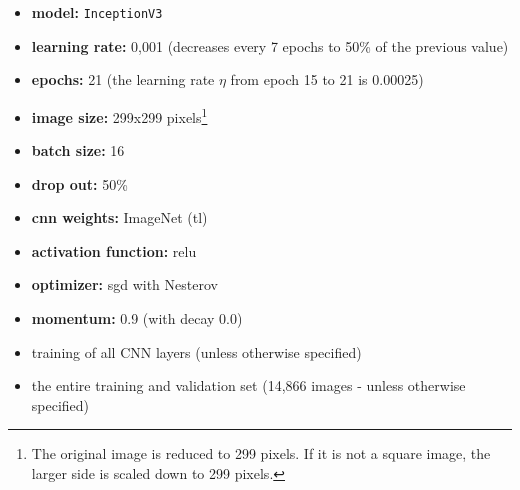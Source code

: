 \documentclass[10pt]{article}
\newif\ifen
\newif\ifde
\newcommand{\en}[1]{\ifen#1\fi}
\newcommand{\de}[1]{\ifde#1\fi}
\begin{document}
					\begin{itemize}
						\setlength\itemsep{0em}
						\item \textbf{model:} \texttt{InceptionV3}
						\item \textbf{learning rate:} 0,001 (decreases every 7 epochs to 50\% of the previous value)
						\item \textbf{epochs:} 21 (the learning rate \(\eta\) from epoch 15 to 21 is 0.00025)
						\item \textbf{image size:} 299x299 pixels\footnote{The original image is reduced to 299 pixels. If it is not a square image, the larger side is scaled down to 299 pixels.}
						\item \textbf{batch size:} 16
						\item \textbf{drop out:} 50\%
						\item \textbf{\ac{cnn} weights:} ImageNet (\ac{tl})
						\item \textbf{activation function:} \ac{relu}
						\item \textbf{optimizer:} \ac{sgd} with Nesterov
						\item \textbf{momentum:} 0.9 (with decay 0.0)
						\item training of all CNN layers (unless otherwise specified)
						\item the entire training and validation set (14,866 images - unless otherwise specified)
					\end{itemize}
					
				\de{\noindent Verschiedene Modelle wurden im Kapitel ``\nameref{sec:section_validation_compare_cnn_models}'' mit den gleichen Parametern wie oben ausprobiert: \texttt{DenseNet121}, \texttt{DenseNet201}, \texttt{InceptionResNetV2}, \texttt{InceptionV3}, \texttt{NASNetLarge}, \texttt{ResNet50}, \texttt{VGG19} und \texttt{Xception}}
				\en{\noindent Different models were tried out in chapter ``\nameref{sec:section_validation_comparison_cnn_models}'' with the same parameters as above: \texttt{DenseNet121}, \texttt{DenseNet201}, \texttt{InceptionResNetV2}, \texttt{InceptionV3}, \texttt{NASNetLarge}, \texttt{ResNet50}, \texttt{VGG19} and \texttt{Xception}}

	\pagebreak
\end{document}
